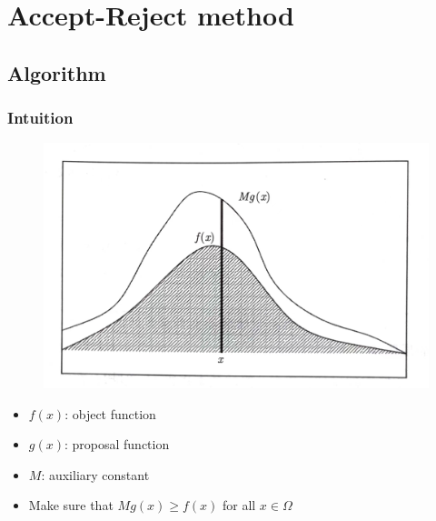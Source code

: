 \section{Accept-Reject method}
\subsection{Algorithm}

\begin{frame}
    \frametitle{Intuition}

    \begin{figure}
        \begin{center}
            \includegraphics[width = .58\linewidth]{image1.png}
        \end{center}
    \end{figure}

    \begin{itemize}
        \item \(f(x)\): object function
        \item \(g(x)\): proposal function
        \item \(M\): auxiliary constant
        \item Make sure that \(Mg(x)\geq f(x)\) for all \(x \in \Omega\)
    \end{itemize}

\end{frame}


